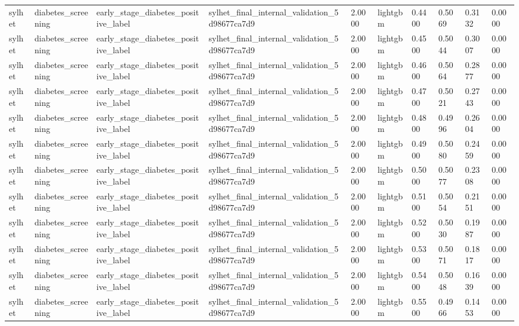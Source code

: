 \begin{tabular}{llllllllll}
sylhet & diabetes\_screening & early\_stage\_diabetes\_positive\_label & sylhet\_final\_internal\_validation\_5d98677ca7d9 & 2.0000 & lightgbm & 0.4400 & 0.5069 & 0.3132 & 0.0000 \\
sylhet & diabetes\_screening & early\_stage\_diabetes\_positive\_label & sylhet\_final\_internal\_validation\_5d98677ca7d9 & 2.0000 & lightgbm & 0.4500 & 0.5044 & 0.3007 & 0.0000 \\
sylhet & diabetes\_screening & early\_stage\_diabetes\_positive\_label & sylhet\_final\_internal\_validation\_5d98677ca7d9 & 2.0000 & lightgbm & 0.4600 & 0.5064 & 0.2877 & 0.0000 \\
sylhet & diabetes\_screening & early\_stage\_diabetes\_positive\_label & sylhet\_final\_internal\_validation\_5d98677ca7d9 & 2.0000 & lightgbm & 0.4700 & 0.5021 & 0.2743 & 0.0000 \\
sylhet & diabetes\_screening & early\_stage\_diabetes\_positive\_label & sylhet\_final\_internal\_validation\_5d98677ca7d9 & 2.0000 & lightgbm & 0.4800 & 0.4996 & 0.2604 & 0.0000 \\
sylhet & diabetes\_screening & early\_stage\_diabetes\_positive\_label & sylhet\_final\_internal\_validation\_5d98677ca7d9 & 2.0000 & lightgbm & 0.4900 & 0.5080 & 0.2459 & 0.0000 \\
sylhet & diabetes\_screening & early\_stage\_diabetes\_positive\_label & sylhet\_final\_internal\_validation\_5d98677ca7d9 & 2.0000 & lightgbm & 0.5000 & 0.5077 & 0.2308 & 0.0000 \\
sylhet & diabetes\_screening & early\_stage\_diabetes\_positive\_label & sylhet\_final\_internal\_validation\_5d98677ca7d9 & 2.0000 & lightgbm & 0.5100 & 0.5054 & 0.2151 & 0.0000 \\
sylhet & diabetes\_screening & early\_stage\_diabetes\_positive\_label & sylhet\_final\_internal\_validation\_5d98677ca7d9 & 2.0000 & lightgbm & 0.5200 & 0.5030 & 0.1987 & 0.0000 \\
sylhet & diabetes\_screening & early\_stage\_diabetes\_positive\_label & sylhet\_final\_internal\_validation\_5d98677ca7d9 & 2.0000 & lightgbm & 0.5300 & 0.5071 & 0.1817 & 0.0000 \\
sylhet & diabetes\_screening & early\_stage\_diabetes\_positive\_label & sylhet\_final\_internal\_validation\_5d98677ca7d9 & 2.0000 & lightgbm & 0.5400 & 0.5048 & 0.1639 & 0.0000 \\
sylhet & diabetes\_screening & early\_stage\_diabetes\_positive\_label & sylhet\_final\_internal\_validation\_5d98677ca7d9 & 2.0000 & lightgbm & 0.5500 & 0.4966 & 0.1453 & 0.0000 \\

\end{tabular}
